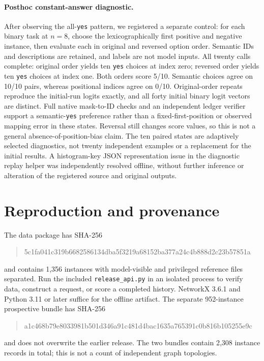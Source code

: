 \documentclass[11pt]{article}
\begin{document}
\paragraph{Posthoc constant-answer diagnostic.}
After observing the all-\texttt{yes} pattern, we registered a separate control:
for each binary task at $n=8$, choose the lexicographically first positive and
negative instance, then evaluate each in original and reversed option order.
Semantic IDs and descriptions are retained, and labels are not model inputs.
All twenty calls complete: original order yields ten \texttt{yes} choices
at index zero; reversed order yields ten \texttt{yes} choices at index one.
Both orders score 5/10. Semantic choices agree on 10/10 pairs, whereas
positional indices agree on 0/10. Original-order repeats reproduce the
initial-run logits exactly, and all forty initial binary logit vectors are
distinct. Full native mask-to-ID checks and an independent ledger verifier
support a semantic-\texttt{yes} preference rather than a fixed-first-position
or observed mapping error in these states. Reversal still changes score
values, so this is not a general absence-of-position-bias claim.
The ten paired states are adaptively selected diagnostics, not twenty
independent examples or a replacement for the initial results.
A histogram-key JSON representation issue in the diagnostic replay helper
was independently resolved offline, without further inference or alteration
of the registered source and original outputs.

\section{Reproduction and provenance}
The data package has SHA-256
\begin{quote}\footnotesize\ttfamily
5c1fa041c319b6682586134dba5f3219a68152ba377a24c4b888d2c23b57851a
\end{quote}
and contains 1,356 instances with model-visible and privileged reference files
separated. Run the included \texttt{release\_api.py} in an isolated process
to verify data, construct a request, or score a completed history.
NetworkX 3.6.1 and Python 3.11 or later suffice for the offline artifact.
The separate 952-instance prospective bundle has SHA-256
\begin{quote}\footnotesize\ttfamily
a1c468b79e8033981b501d346a91c481d4bac1635a765391c0b816b105255e9c
\end{quote}
and does not overwrite the earlier release. The two bundles contain 2,308
instance records in total; this is not a count of independent graph topologies.
\end{document}
